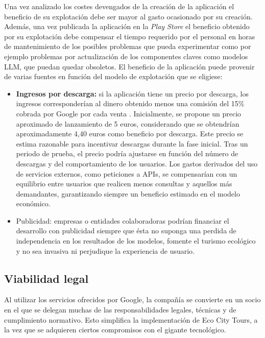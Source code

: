 Una vez analizado los costes devengados de la creación de la aplicación el beneficio de su explotación debe ser mayor al gasto ocasionado por su creación. Además, una vez publicada la aplicación en la \textit{Play Store} el beneficio obtenido por su explotación debe compensar el tiempo requerido por el personal en horas de mantenimiento de los posibles problemas que pueda experimentar como por ejemplo problemas por actualización de los componentes claves como modelos LLM, que puedan quedar obsoletos. El beneficio de la aplicación puede provenir de varias fuentes en función del modelo de explotación que se eligiese:
\begin{itemize}
	\item \textbf{Ingresos por descarga:} si la aplicación tiene un precio por descarga, los ingresos corresponderían al dinero obtenido menos una comisión del 15\% cobrada por Google por cada venta \cite{googleplay_commission}. Inicialmente, se propone un precio aproximado de lanzamiento de 5 euros, considerando que se obtendrían aproximadamente 4,40 euros como beneficio por descarga. Este precio se estima razonable para incentivar descargas durante la fase inicial. Tras un periodo de prueba, el precio podría ajustarse en función del número de descargas y del comportamiento de los usuarios. Los gastos derivados del uso de servicios externos, como peticiones a APIs, se compensarían con un equilibrio entre usuarios que realicen menos consultas y aquellos más demandantes, garantizando siempre un beneficio estimado en el modelo económico.

	\item{Publicidad:} empresas o entidades colaboradoras podrían financiar el desarrollo con publicidad siempre que ésta no suponga una perdida de independencia en los resultados de los modelos, fomente el turismo ecológico y no sea invasiva ni perjudique la experiencia de usuario.
\end{itemize}

\subsection{Viabilidad legal}
Al utilizar los servicios ofrecidos por Google, la compañía se convierte en un socio en el que se delegan muchas de las responsabilidades legales, técnicas y de cumplimiento normativo. Esto simplifica la implementación de Eco City Tours, a la vez que se adquieren ciertos compromisos con el gigante tecnológico. 

